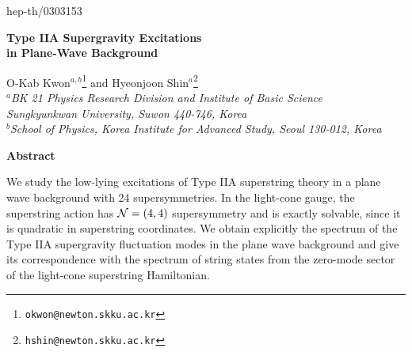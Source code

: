 \documentclass[a4paper,12pt]{article}
\numberwithin{equation}{section}
\begin{document}
\begin{titlepage}

\renewcommand{\thefootnote}{\fnsymbol{footnote}}

\hfill{hep-th/0303153}

\vspace{15mm}
\baselineskip 9mm
\begin{center}
{\LARGE \bf Type IIA Supergravity Excitations\\
in Plane-Wave Background}
\end{center}

\baselineskip 6mm
\vspace{10mm}
\begin{center}
  O-Kab Kwon$^{a,b}$\footnote{\tt okwon@newton.skku.ac.kr} and
  Hyeonjoon Shin$^a$\footnote{\tt hshin@newton.skku.ac.kr}
  \\[5mm]
  {\sl $^a$BK 21 Physics Research Division and Institute of Basic
    Science \\ Sungkyunkwan University, Suwon 440-746, Korea \\
    $^b$School of Physics, Korea Institute for Advanced Study, Seoul
    130-012, Korea }
\end{center}

\thispagestyle{empty}

\vfill
\begin{center}
{\bf Abstract}
\end{center}
\noindent
We study the low-lying excitations of Type IIA superstring theory in a
plane wave background with 24 supersymmetries.  In the light-cone
gauge, the superstring action has ${\cal N}=(4,4)$ supersymmetry and
is exactly solvable, since it is quadratic in superstring coordinates.
We obtain explicitly the spectrum of the Type IIA supergravity
fluctuation modes in the plane wave background and give its
correspondence with the spectrum of string states from the zero-mode
sector of the light-cone superstring Hamiltonian.

\vspace{20mm}
\end{titlepage}
\end{document}
